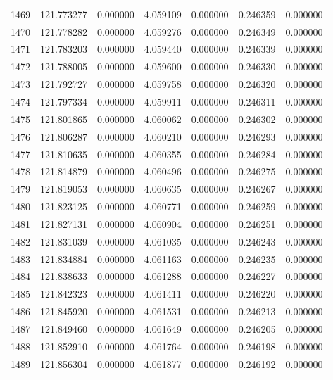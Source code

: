 \begin{tabular}{rrrrrrr}
1469 & 121.773277 &    0.000000 &  4.059109 &    0.000000 &    0.246359 &  0.000000 \\
1470 & 121.778282 &    0.000000 &  4.059276 &    0.000000 &    0.246349 &  0.000000 \\
1471 & 121.783203 &    0.000000 &  4.059440 &    0.000000 &    0.246339 &  0.000000 \\
1472 & 121.788005 &    0.000000 &  4.059600 &    0.000000 &    0.246330 &  0.000000 \\
1473 & 121.792727 &    0.000000 &  4.059758 &    0.000000 &    0.246320 &  0.000000 \\
1474 & 121.797334 &    0.000000 &  4.059911 &    0.000000 &    0.246311 &  0.000000 \\
1475 & 121.801865 &    0.000000 &  4.060062 &    0.000000 &    0.246302 &  0.000000 \\
1476 & 121.806287 &    0.000000 &  4.060210 &    0.000000 &    0.246293 &  0.000000 \\
1477 & 121.810635 &    0.000000 &  4.060355 &    0.000000 &    0.246284 &  0.000000 \\
1478 & 121.814879 &    0.000000 &  4.060496 &    0.000000 &    0.246275 &  0.000000 \\
1479 & 121.819053 &    0.000000 &  4.060635 &    0.000000 &    0.246267 &  0.000000 \\
1480 & 121.823125 &    0.000000 &  4.060771 &    0.000000 &    0.246259 &  0.000000 \\
1481 & 121.827131 &    0.000000 &  4.060904 &    0.000000 &    0.246251 &  0.000000 \\
1482 & 121.831039 &    0.000000 &  4.061035 &    0.000000 &    0.246243 &  0.000000 \\
1483 & 121.834884 &    0.000000 &  4.061163 &    0.000000 &    0.246235 &  0.000000 \\
1484 & 121.838633 &    0.000000 &  4.061288 &    0.000000 &    0.246227 &  0.000000 \\
1485 & 121.842323 &    0.000000 &  4.061411 &    0.000000 &    0.246220 &  0.000000 \\
1486 & 121.845920 &    0.000000 &  4.061531 &    0.000000 &    0.246213 &  0.000000 \\
1487 & 121.849460 &    0.000000 &  4.061649 &    0.000000 &    0.246205 &  0.000000 \\
1488 & 121.852910 &    0.000000 &  4.061764 &    0.000000 &    0.246198 &  0.000000 \\
1489 & 121.856304 &    0.000000 &  4.061877 &    0.000000 &    0.246192 &  0.000000 \\

\end{tabular}

